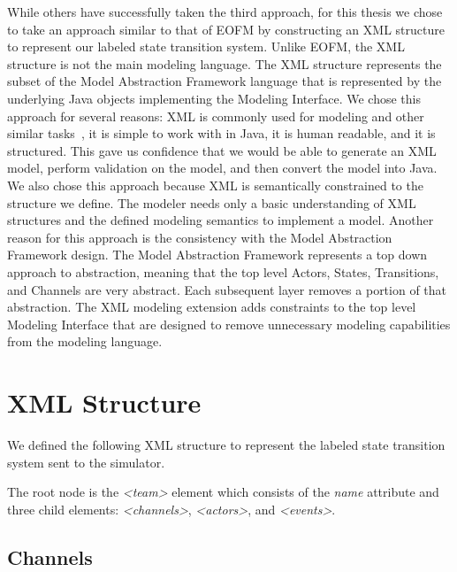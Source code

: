 While others have successfully taken the third approach, for this thesis we chose to take an approach similar to that of EOFM by constructing an XML structure to represent our labeled state transition system.  Unlike EOFM, the XML structure is not the main modeling language.  The XML structure represents the subset of the Model Abstraction Framework language that is represented by the underlying Java objects implementing the Modeling Interface.  We chose this approach for several reasons:  XML is commonly used for modeling and other similar tasks~\cite{bolton2009enhanced}, it is simple to work with in Java, it is human readable, and it is structured.  This gave us confidence that we would be able to generate an XML model, perform validation on the model, and then convert the model into Java.  We also chose this approach because XML is semantically constrained to the structure we define.  The modeler needs only a basic understanding of XML structures and the defined modeling semantics to implement a model.  Another reason for this approach is the consistency with the Model Abstraction Framework design.  The Model Abstraction Framework represents a top down approach to abstraction, meaning that the top level Actors, States, Transitions, and Channels are very abstract.  Each subsequent layer removes a portion of that abstraction.  The XML modeling extension adds constraints to the top level Modeling Interface that are designed to remove unnecessary modeling capabilities from the modeling language.

\section{XML Structure}

We defined the following XML structure to represent the labeled state transition system sent to the simulator.  

The root node is the {\em \textless team\textgreater} element which consists of the {\em name} attribute and three child elements: {\em \textless channels\textgreater}, {\em \textless actors\textgreater}, and {\em \textless events\textgreater}.

\begin{spacing}{.5}

\end{spacing}

\subsection{Channels}

